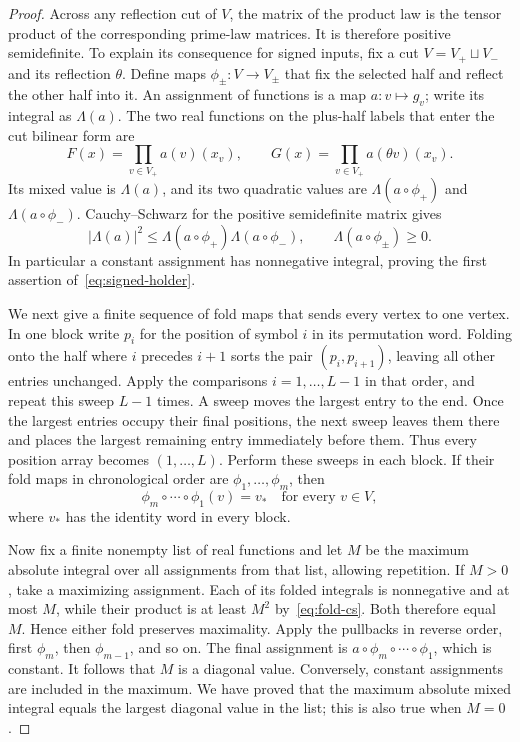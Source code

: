 \begin{proof}
Across any reflection cut of \(V\), the matrix of the product law is
the tensor product of the corresponding prime-law matrices.  It is
therefore positive semidefinite.  To explain its consequence for signed
inputs, fix a cut \(V=V_+\sqcup V_-\) and its reflection \(\theta\).
Define maps \(\phi_\pm:V\to V_\pm\) that fix the selected half and
reflect the other half into it.  An assignment of functions is a map
\(a:v\mapsto g_v\); write its integral as \(\Lambda(a)\).
The two real functions on the plus-half labels that enter the cut
bilinear form are
\[
 F(x)=\prod_{v\in V_+}a(v)(x_v),
 \qquad
 G(x)=\prod_{v\in V_+}a(\theta v)(x_v).
\]
Its mixed value is \(\Lambda(a)\), and its two quadratic values are
\(\Lambda(a\circ\phi_+)\) and \(\Lambda(a\circ\phi_-)\).
Cauchy--Schwarz for the positive semidefinite matrix gives
\begin{equation}
 |\Lambda(a)|^2
 \le \Lambda(a\circ\phi_+)\Lambda(a\circ\phi_-),
 \qquad \Lambda(a\circ\phi_\pm)\ge0.
 \label{eq:fold-cs}
\end{equation}
In particular a constant assignment has nonnegative integral, proving
the first assertion of~\eqref{eq:signed-holder}.

We next give a finite sequence of fold maps that sends every vertex to
one vertex.  In one block write \(p_i\) for the position of symbol
\(i\) in its permutation word.  Folding onto the half where \(i\)
precedes \(i+1\) sorts the pair \((p_i,p_{i+1})\), leaving all other
entries unchanged.  Apply the comparisons \(i=1,\ldots,L-1\) in that
order, and repeat this sweep \(L-1\) times.  A sweep moves the largest
entry to the end.  Once the largest entries occupy their final positions,
the next sweep leaves them there and places the largest remaining entry
immediately before them.  Thus every position array becomes
\((1,\ldots,L)\).  Perform these sweeps in each block.  If their fold
maps in chronological order are \(\phi_1,\ldots,\phi_m\), then
\[
 \phi_m\circ\cdots\circ\phi_1(v)=v_*
 \quad\text{for every }v\in V,
\]
where \(v_*\) has the identity word in every block.

Now fix a finite nonempty list of real functions and let \(M\) be the
maximum absolute integral over all assignments from that list, allowing
repetition.  If \(M>0\), take a maximizing assignment.  Each of its
folded integrals is nonnegative and at most \(M\), while their product
is at least \(M^2\) by~\eqref{eq:fold-cs}.  Both therefore equal
\(M\).  Hence either fold preserves maximality.  Apply the pullbacks
in reverse order, first \(\phi_m\), then \(\phi_{m-1}\), and so on.
The final assignment is
\(a\circ\phi_m\circ\cdots\circ\phi_1\), which is constant.  It
follows that \(M\) is a diagonal value.  Conversely, constant
assignments are included in the maximum.  We have proved that the
maximum absolute mixed integral equals the largest diagonal value in
the list; this is also true when \(M=0\).


\end{proof}
